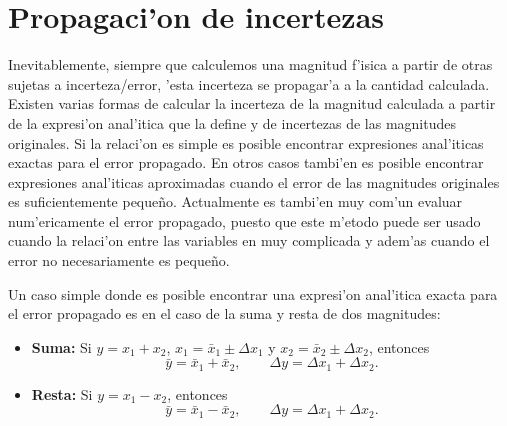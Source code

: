 \section{Propagaci'on de incertezas}

Inevitablemente, siempre que calculemos una magnitud f'isica a partir de otras sujetas a incerteza/error, 'esta incerteza se propagar'a a la cantidad calculada. Existen varias formas de calcular la incerteza de la magnitud calculada a partir de la expresi'on anal'itica que la define y de  incertezas de las magnitudes originales. Si la relaci'on es simple es posible encontrar expresiones anal'iticas exactas para el error propagado. En otros casos tambi'en es posible encontrar expresiones anal'iticas aproximadas cuando el error de las magnitudes originales es suficientemente peque\~no. Actualmente es tambi'en muy com'un evaluar num'ericamente el error propagado, puesto que este m'etodo puede ser usado cuando la relaci'on entre las variables en muy complicada y adem'as cuando el error no necesariamente es peque\~no.

Un caso simple donde es posible encontrar una expresi'on anal'itica exacta para el error propagado es en el caso de la suma y resta de dos magnitudes:
\begin{itemize}
\item \textbf{Suma:} Si $y=x_1+x_2$, $x_1 = \bar{x}_1\pm\Delta x_1$ y $x_2 = \bar{x}_2\pm\Delta x_2$, entonces
\begin{equation}
\bar{y}= \bar{x}_1+\bar{x}_2, \qquad  \Delta y= \Delta x_1+\Delta x_2.
\end{equation}
\item \textbf{Resta:} Si $y=x_1-x_2$, entonces
\begin{equation}
\bar{y}= \bar{x}_1-\bar{x}_2, \qquad  \Delta y = \Delta x_1+\Delta x_2.
\end{equation}
\end{itemize}

